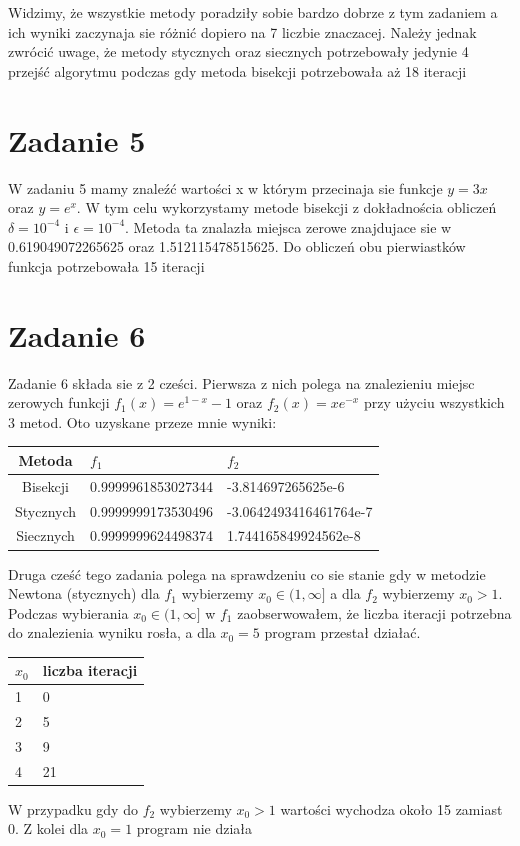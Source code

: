 \documentclass{article} %
\begin{document}
	Widzimy, że wszystkie metody poradziły sobie bardzo dobrze z tym zadaniem a ich wyniki zaczynaja sie różnić dopiero na 7 liczbie znaczacej. Należy jednak zwrócić uwage, że metody stycznych oraz siecznych potrzebowały jedynie 4 przejść algorytmu podczas gdy metoda bisekcji potrzebowała aż 18 iteracji

	\section*{Zadanie 5} %
		
		W zadaniu 5 mamy znaleźć wartości x w którym przecinaja sie funkcje $y=3x$ oraz $y=e^x$. W tym celu wykorzystamy metode bisekcji z dokładnościa obliczeń $\delta=10^{-4}$ i $\epsilon=10^{-4}$. Metoda ta znalazła miejsca zerowe znajdujace sie w 0.619049072265625 oraz 1.512115478515625. Do obliczeń obu pierwiastków funkcja potrzebowała 15 iteracji

	\section*{Zadanie 6} %
		
		Zadanie 6 składa sie z 2 cześci. Pierwsza z nich polega na znalezieniu miejsc zerowych funkcji $f_1(x)=e^{1-x}-1$ oraz $f_2(x)=xe^{-x}$ przy użyciu wszystkich 3 metod. Oto uzyskane przeze mnie wyniki:

	\vspace{0.1cm}
		\begin{tabularx}{\textwidth}{|c|X|X|}
		\hline
		Metoda & $f_1$ & $f_2$\\
		\hline
		Bisekcji & 0.9999961853027344 & -3.814697265625e-6\\
		\hline
		Stycznych & 0.9999999173530496 & -3.0642493416461764e-7\\
		\hline
		Siecznych &0.9999999624498374 & 1.744165849924562e-8\\
		\hline
		\end{tabularx}
	\vspace{0.1cm}


		Druga cześć tego zadania polega na sprawdzeniu co sie stanie gdy w metodzie Newtona (stycznych) dla $f_1$ wybierzemy $x_0\in(1,\infty]$ a dla $f_2$ wybierzemy $x_0>1$. Podczas wybierania  $x_0\in(1,\infty]$ w $f_1$ zaobserwowałem, że liczba iteracji potrzebna do znalezienia wyniku rosła, a dla $x_0=5$ program przestał działać.

	\vspace{0.1cm}
		\begin{tabularx}{\textwidth}{|X|X|}
		\hline
		$x_0$ & liczba iteracji\\
		\hline
		1 & 0 \\
		\hline
		2 & 5 \\
		\hline
		3 & 9 \\
		\hline
		4 & 21 \\
		\hline
		\end{tabularx}
	\vspace{0.1cm}

		W przypadku gdy do $f_2$ wybierzemy $x_0>1$ wartości wychodza około 15 zamiast 0. Z kolei dla $x_0=1$ program nie działa
\end{document}
